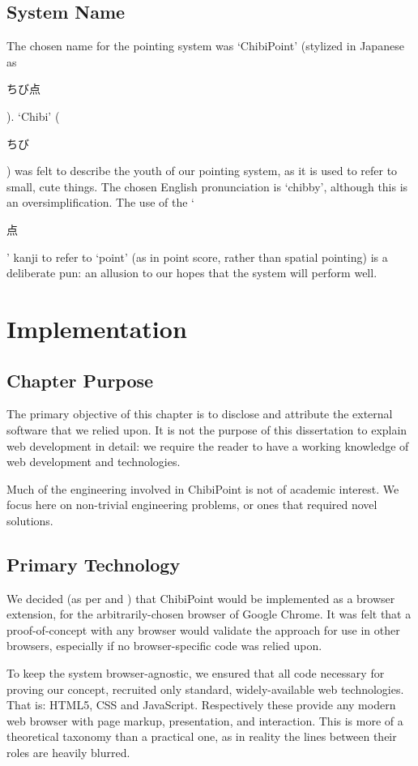 \documentclass[a4paper, 12pt]{report}
\begin{document}
\section{System Name}
The chosen name for the pointing system was `ChibiPoint' (stylized in Japanese as \begin{CJK}{UTF8}{min}ちび点\end{CJK}). `Chibi' (\begin{CJK}{UTF8}{min}ちび\end{CJK}) was felt to describe the youth of our pointing system, as it is used to refer to small, cute things. The chosen English pronunciation is `chibby', although this is an oversimplification. The use of the `\begin{CJK}{UTF8}{min}点\end{CJK}' kanji to refer to `point' (as in point score, rather than spatial pointing) is a deliberate pun: an allusion to our hopes that the system will perform well.

\chapter{Implementation}
\label{chap:implementation}
\section{Chapter Purpose}
The primary objective of this chapter is to disclose and attribute the external software that we relied upon. It is not the purpose of this dissertation to explain web development in detail: we require the reader to have a working knowledge of web development and technologies.

Much of the engineering involved in ChibiPoint is not of academic interest. We focus here on non-trivial engineering problems, or ones that required novel solutions.

\section{Primary Technology}
We decided (as per  and ) that ChibiPoint would be implemented as a browser extension, for the arbitrarily-chosen browser of Google Chrome. It was felt that a proof-of-concept with any browser would validate the approach for use in other browsers, especially if no browser-specific code was relied upon.

To keep the system browser-agnostic, we ensured that all code necessary for proving our concept, recruited only standard, widely-available web technologies. That is: HTML5, CSS and JavaScript. Respectively these provide any modern web browser with page markup, presentation, and interaction. This is more of a theoretical taxonomy than a practical one, as in reality the lines between their roles are heavily blurred.
\end{document}
